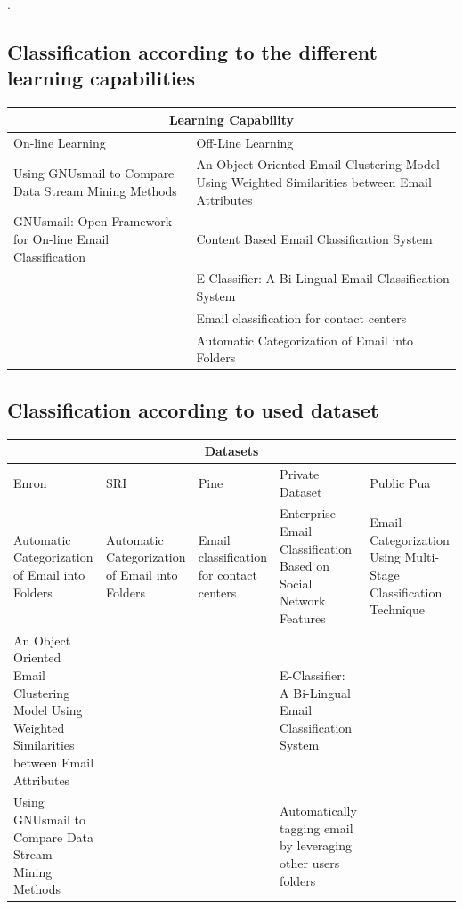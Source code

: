 \documentclass[12pt]{article}
\begin{document}
.
\newpage

\subsection{Classification according to the different learning capabilities}

\begin{center}
\begin{tabular}{|p{6cm}|p{6cm}|}
\hline
\multicolumn{2}{|c|}{Learning Capability} \\
\hline
On-line Learning & Off-Line Learning 
\\ \hline
Using GNUsmail to Compare Data Stream Mining Methods

&  An Object Oriented Email Clustering Model Using  Weighted Similarities between Email Attributes
\\ \hline

GNUsmail: Open Framework for On-line Email Classification
& Content Based Email Classification System
\\ \hline

& E-Classifier: A Bi-Lingual Email Classification System
\\ \hline

& Email classification for contact centers
\\ \hline

& 
Automatic Categorization of Email into Folders

\\ \hline

\end{tabular}
\end{center}

\newpage

\subsection{Classification according to used dataset}

\begin{center}
\begin{tabular}{|p{2.5cm}|p{2.5cm}|p{2.5cm}|p{2.5cm}|p{2.5cm}|}
\hline
\multicolumn{5}{|c|}{Datasets} \\
\hline
Enron & SRI & Pine & Private Dataset & Public Pua
\\ \hline
Automatic Categorization of Email into Folders &
Automatic Categorization of Email into Folders & Email classification for contact centers &
Enterprise Email Classification Based on Social Network Features & Email Categorization Using Multi-Stage Classification Technique
\\ \hline
An Object Oriented Email Clustering Model Using  Weighted Similarities between Email Attributes &
& & E-Classifier: A Bi-Lingual Email Classification System &
\\ \hline
Using GNUsmail to Compare Data Stream Mining Methods & & &Automatically tagging email by leveraging other users folders & 
\\ \hline
\end{tabular}
\end{center}
\end{document}

